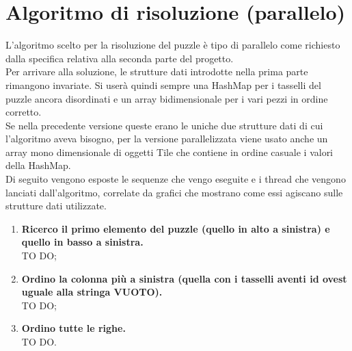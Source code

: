 % 
%
%

\section{Algoritmo di risoluzione (parallelo)} %
\label{sec:algoritmo_di_risoluzione_parallelo_}
L'algoritmo scelto per la risoluzione del puzzle è tipo di parallelo come richiesto dalla specifica relativa alla seconda parte del progetto. \\
Per arrivare alla soluzione, le strutture dati introdotte nella prima parte rimangono invariate. Si userà quindi sempre una HashMap per i tasselli del puzzle ancora disordinati e un array bidimensionale per i vari pezzi in ordine corretto. \\
Se nella precedente versione queste erano le uniche due strutture dati di cui l'algoritmo aveva bisogno, per la versione parallelizzata viene usato anche un array mono dimensionale di oggetti Tile che contiene in ordine casuale i valori della HashMap. \\
Di seguito vengono esposte le sequenze che vengo eseguite e i thread che vengono lanciati dall'algoritmo, correlate da grafici che mostrano come essi agiscano sulle strutture dati utilizzate.

	\begin{enumerate}
		\item \textbf{Ricerco il primo elemento del puzzle (quello in alto a sinistra) e quello in basso a sinistra.} \\
		TO DO;
		\item \textbf{Ordino la colonna più a sinistra (quella con i tasselli aventi id ovest uguale alla stringa VUOTO).} \\
		TO DO;
		\item \textbf{Ordino tutte le righe.} \\
		TO DO.
	\end{enumerate}





